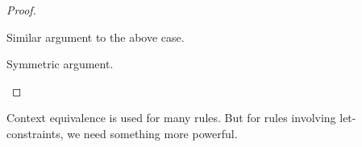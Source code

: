\documentclass[acmsmall,screen,nonacm,review]{acmart}
\begin{document}
\begin{lemma}
\begin{proof}
\begin{proofcases}
\begin{proofcases}
\begin{proofcases}

	      \begin{llproof}
		Similar argument to the above case.
	      \end{llproof}
	  \end{proofcases}


	  \proofcase{$\impliedby$}

	  \begin{llproof}
	    Symmetric argument.
	  \end{llproof}
	\end{proofcases}
    \end{proofcases}
  \end{proof}
\end{lemma}

Context equivalence is used for many rules. But for rules involving let-constraints,
we need something more powerful.
\end{document}
